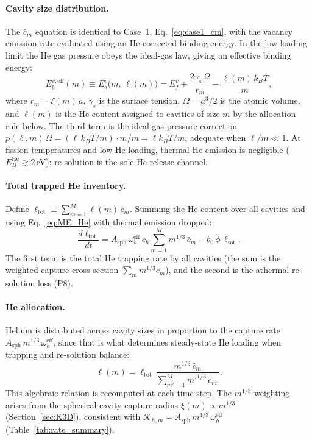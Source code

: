 \paragraph{Cavity size distribution.}
The $\bar{c}_m$ equation is identical to Case~1,
Eq.~\eqref{eq:case1_cm}, with the vacancy emission rate evaluated using
an He-corrected binding energy. In the low-loading limit the He gas
pressure obeys the ideal-gas law, giving an effective binding energy:
\begin{equation}\label{eq:Ebv_eff}
    E_b^{v,\mathrm{eff}}(m)
    \equiv E_b^v\bigl(m,\,\ell(m)\bigr)
    = E_f^v + \frac{2\gamma_s\,\Omega}{r_m}
    - \frac{\ell(m)\,k_BT}{m},
\end{equation}
where $r_m = \xi(m)\,a$, $\gamma_s$ is the surface tension,
$\Omega = a^3/2$ is the atomic volume, and $\ell(m)$ is the He content
assigned to cavities of size $m$ by the allocation rule below. The
third term is the ideal-gas pressure correction $p(\ell,m)\,\Omega =
(\ell\,k_BT/m)\cdot m/m = \ell k_BT/m$, adequate when $\ell/m \ll 1$.
At fission temperatures and low He loading, thermal He emission is
negligible ($E_B^{\mathrm{He}} \gtrsim 2$\,eV); re-solution is the
sole He release channel.

\paragraph{Total trapped He inventory.}
Define $\ell_{\mathrm{tot}} \equiv \sum_{m=1}^M \ell(m)\,\bar{c}_m$.
Summing the He content over all cavities and using
Eq.~\eqref{eq:ME_He} with thermal emission dropped:
\begin{equation}\label{eq:case2_ltot}
    \frac{d\ell_{\mathrm{tot}}}{dt}
    = A_{\mathrm{sph}}\,\omega_h^{\mathrm{eff}}\,c_h
      \sum_{m=1}^{M} m^{1/3}\,\bar{c}_m
    - b_0\,\dot{\phi}\,\ell_{\mathrm{tot}}.
\end{equation}
The first term is the total He trapping rate by all cavities (the sum
is the weighted capture cross-section $\sum_m m^{1/3}\bar{c}_m$), and
the second is the athermal re-solution loss (P8).

\paragraph{He allocation.}
Helium is distributed across cavity sizes in proportion to the capture
rate $A_{\mathrm{sph}}\,m^{1/3}\,\omega_h^{\mathrm{eff}}$, since that
is what determines steady-state He loading when trapping and re-solution
balance:
\begin{equation}\label{eq:allocation}
    \ell(m)
    = \ell_{\mathrm{tot}}\,
      \frac{m^{1/3}\,\bar{c}_m}
           {\displaystyle\sum_{m'=1}^{M} m'^{1/3}\,\bar{c}_{m'}}.
\end{equation}
This algebraic relation is recomputed at each time step. The
$m^{1/3}$ weighting arises from the spherical-cavity capture radius
$\xi(m) \propto m^{1/3}$ (Section~\ref{sec:K3D}), consistent with
$\mathcal{K}_{h,m} = A_{\mathrm{sph}}\,m^{1/3}\,\omega_h^{\mathrm{eff}}$
(Table~\ref{tab:rate_summary}).

